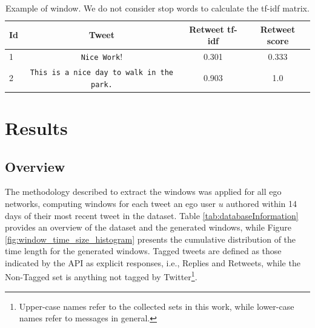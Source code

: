 \begin{table}[!tbh]
	\fontsize{9pt}{10pt}\selectfont
	\centering
		\begin{tabular}{|l|c|c|c|}
			\hline
			Id & Tweet & Retweet tf-idf & Retweet score\\ \hline
			1 & \verb!Nice Work!! & 0.301 & 0.333 \\ \hline
			2 & \verb!This is a nice day to walk in the park.! & 0.903 & 1.0 \\ \hline
		\end{tabular}
		\caption{\color{red}Example of window. We do not consider stop words to calculate the tf-idf matrix.}
	\label{tab:windowExample}
\end{table}
\color{black}

\section{Results}

\subsection{Overview}

The methodology described to extract the windows was applied for all \totalUsers{} ego networks, computing windows for each tweet an ego user $u$ authored within 14 days of their most recent tweet in the dataset. 
Table \ref{tab:databaseInformation} provides an overview of the dataset and the generated windows, while Figure \ref{fig:window_time_size_histogram} presents the cumulative distribution of the time length for the generated windows.  
Tagged tweets are defined as those indicated by the API as explicit responses, i.e., Replies and Retweets, while the Non-Tagged set is anything not tagged by Twitter\footnote{\label{datasets}Upper-case names refer to the collected sets in this work, while lower-case names refer to messages in general.}. 

